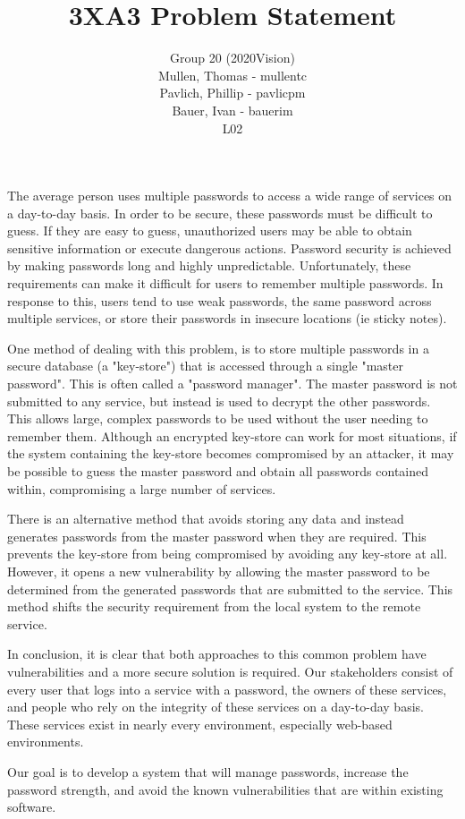 \documentclass[12pt]{article}
\title{3XA3 Problem Statement}
\author{Group 20 (2020Vision)\\
Mullen, Thomas - mullentc \\
Pavlich, Phillip - pavlicpm \\
Bauer, Ivan - bauerim \\
L02}
\date{}
\begin{document}
\maketitle

\begin{flushleft}
\setlength{\parindent}{5ex}
The average person uses multiple passwords to access a wide range of services on a day-to-day basis. In order to be secure, these passwords must be difficult to guess. If they are easy to guess, unauthorized users may be able to obtain sensitive information or execute dangerous actions. Password security is achieved by making passwords long and highly unpredictable. Unfortunately, these requirements can make it difficult for users to remember multiple passwords. In response to this, users tend to use weak passwords, the same password across multiple services, or store their passwords in insecure locations (ie sticky notes).\newline

One method of dealing with this problem, is to store multiple passwords in a secure database (a "key-store") that is accessed through a single "master password". This is often called a "password manager". The master password is not submitted to any service, but instead is used to decrypt the other passwords. This allows large, complex passwords to be used without the user needing to remember them. Although an encrypted key-store can work for most situations, if the system containing the key-store becomes compromised by an attacker, it may be possible to guess the master password and obtain all passwords contained within, compromising a large number of services.\newline

There is an alternative method that avoids storing any data and instead generates passwords from the master password when they are required. This prevents the key-store from being compromised by avoiding any key-store at all. However, it opens a new vulnerability by allowing the master password to be determined from the generated passwords that are submitted to the service. This method shifts the security requirement from the local system to the remote service.\newline

In conclusion, it is clear that both approaches to this common problem have vulnerabilities and a more secure solution is required. Our stakeholders consist of every user that logs into a service with a password, the owners of these services, and people who rely on the integrity of these services on a day-to-day basis. These services exist in nearly every environment, especially web-based environments.\newline

Our goal is to develop a system that will manage passwords, increase the password strength, and avoid the known vulnerabilities that are within existing software.\newline

\end{flushleft}
\end{document}
